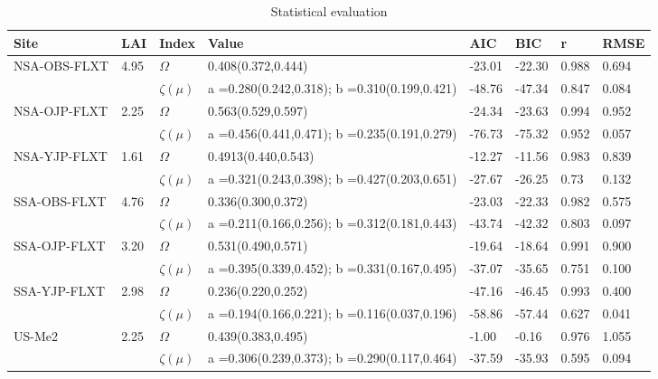 \documentclass[a4paper,11pt]{report}
\begin{document}
\begin{sidewaystable}
\caption{Statistical evaluation}
\begin{tabular}{p{4.0cm} p{2.1cm} p{1.5cm} p{4.1cm} p{2.1cm} p{2.1cm} p{2.1cm} p{2.1cm}}
\hline
\hline   
\bf Site & \bf LAI &  \bf Index & \bf Value & \bf AIC & \bf BIC & \bf r &  \bf RMSE\\
 \hline
\multirow{2}{*}{NSA-OBS-FLXT} 
     & 4.95  &  \bf $\Omega$         &  0.408(0.372,0.444) & -23.01 &	-22.30	& 0.988 &	0.694\\
     &       &  \bf $\zeta(\mu)$     &  a =0.280(0.242,0.318); b =0.310(0.199,0.421) & -48.76 & -47.34 & 0.847 & 0.084\\
\multirow{2}{*}{NSA-OJP-FLXT} 
     & 2.25  &  \bf $\Omega$     &  0.563(0.529,0.597) & -24.34	& -23.63 & 0.994 & 0.952\\
     &       &  \bf $\zeta(\mu)$ &  a =0.456(0.441,0.471); b =0.235(0.191,0.279) & -76.73 &	-75.32	& 0.952 &	0.057\\
\multirow{2}{*}{NSA-YJP-FLXT} 
     & 1.61 &  \bf $\Omega$         &  0.4913(0.440,0.543) & -12.27 &	-11.56 &	0.983	& 0.839\\
     & &  \bf $\zeta(\mu)$          &  a =0.321(0.243,0.398); b =0.427(0.203,0.651) & -27.67 &	-26.25	& 0.73 &	0.132\\
\multirow{2}{*}{SSA-OBS-FLXT} 
     & 4.76 &  \bf $\Omega$         &  0.336(0.300,0.372) & -23.03 & -22.33 & 0.982 & 0.575\\
     & &  \bf $\zeta(\mu)$          &  a =0.211(0.166,0.256); b =0.312(0.181,0.443) & -43.74	& -42.32 & 0.803 & 0.097
\\
\multirow{2}{*}{SSA-OJP-FLXT} 
     & 3.20 &  \bf $\Omega$         &  0.531(0.490,0.571) & -19.64 & -18.64 & 0.991 & 0.900\\
    &  &  \bf $\zeta(\mu)$          &  a =0.395(0.339,0.452); b =0.331(0.167,0.495) & -37.07 & -35.65 & 0.751 & 0.100\\
\multirow{2}{*}{SSA-YJP-FLXT} 
     & 2.98 &  \bf $\Omega$         &  0.236(0.220,0.252) & -47.16 & -46.45 & 0.993 & 0.400\\
    &  &  \bf $\zeta(\mu)$          &  a =0.194(0.166,0.221); b =0.116(0.037,0.196) & -58.86 & -57.44 & 0.627 & 0.041\\
\multirow{2}{*}{US-Me2} 
    & 2.25  &  \bf $\Omega$         &  0.439(0.383,0.495) & -1.00 & -0.16 & 0.976 & 1.055\\
    &  &  \bf $\zeta(\mu)$         &  a =0.306(0.239,0.373); b =0.290(0.117,0.464) & -37.59	& -35.93 & 0.595 & 0.094\\

\end{tabular}
\end{sidewaystable}
\end{document}
